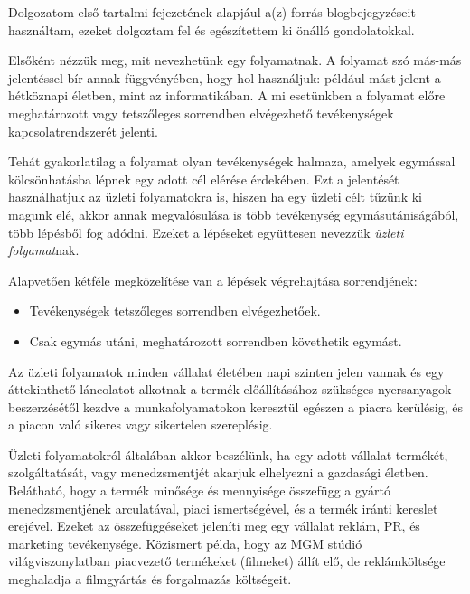

Dolgozatom első tartalmi fejezetének alapjául a(z) \cite{xflower} forrás blogbejegyzéseit használtam, ezeket dolgoztam fel és egészítettem ki önálló gondolatokkal.


Elsőként nézzük meg, mit nevezhetünk egy folyamatnak. A folyamat szó más-más jelentéssel bír annak függvényében, hogy hol használjuk: például mást jelent a hétköznapi életben, mint az informatikában. A mi esetünkben a folyamat előre meghatározott vagy tetszőleges sorrendben elvégezhető tevékenységek kapcsolatrendszerét jelenti.

Tehát gyakorlatilag a folyamat olyan tevékenységek halmaza, amelyek egymással kölcsönhatásba lépnek egy adott cél elérése érdekében. Ezt a jelentését használhatjuk az üzleti folyamatokra is, hiszen ha egy üzleti célt tűzünk ki magunk elé, akkor annak megvalósulása is több tevékenység egymásutániságából, több lépésből fog adódni. Ezeket a lépéseket együttesen nevezzük \textit{üzleti folyamat}nak.

Alapvetően kétféle megközelítése van a lépések végrehajtása sorrendjének:

\begin{itemize}
\item Tevékenységek tetszőleges sorrendben elvégezhetőek.
\item Csak egymás utáni, meghatározott sorrendben követhetik egymást.
\end{itemize}

Az üzleti folyamatok minden vállalat életében napi szinten jelen vannak és egy áttekinthető láncolatot alkotnak a termék előállításához szükséges nyersanyagok beszerzésétől kezdve a munkafolyamatokon keresztül egészen a piacra kerülésig, és a piacon való sikeres vagy sikertelen szereplésig.

Üzleti folyamatokról általában akkor beszélünk, ha egy adott vállalat termékét, szolgáltatását, vagy menedzsmentjét akarjuk elhelyezni a gazdasági életben. Belátható, hogy a termék minősége és mennyisége összefügg a gyártó menedzsmentjének arculatával, piaci ismertségével, és a termék iránti kereslet erejével. Ezeket az összefüggéseket jeleníti meg egy vállalat reklám, PR, és marketing tevékenysége. Közismert példa, hogy az MGM stúdió világviszonylatban piacvezető termékeket (filmeket) állít elő, de reklámköltsége meghaladja a filmgyártás és forgalmazás költségeit.

